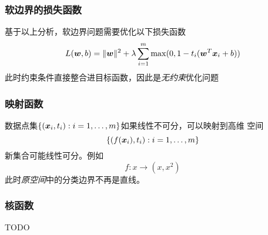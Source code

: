 \documentclass[14pt]{beamer}
\begin{document}
\begin{frame}
  \frametitle{软边界的损失函数}
  基于以上分析，软边界问题需要优化以下损失函数
  \begin{equation}
    L(\bm{w},b)=\|\bm{w}\|^2+\lambda\sum_{i=1}^{m}\max(0, 1-t_i(\bm{w}^T\bm{x}_i+b))
  \end{equation}
  此时约束条件直接整合进目标函数，因此是\emph{无约束}优化问题 
\end{frame}

\begin{frame}
  \frametitle{映射函数}
  数据点集$\{(\bm{x}_i, t_i):i=1,\ldots,m\}$如果线性不可分，可以映射到高维
  空间
  $$\{(f(\bm{x}_i), t_i):i=1,\ldots,m\}$$
  新集合可能线性可分。例如
  $$f:x\to(x, x^2)$$
  此时\emph{原空间}中的分类边界不再是直线。
\end{frame}

\begin{frame}
  \frametitle{核函数}
TODO
  

\end{frame}
\end{document}
